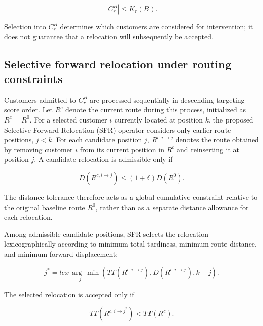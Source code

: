 \documentclass[11pt,a4paper]{article}
\begin{document}
\begin{equation}
\left| C_{r}^{B} \right| \leq K_{r}(B).
\label{eq:14}
\end{equation}

Selection into \(C_{r}^{B}\) determines which customers are considered
for intervention; it does not guarantee that a relocation will
subsequently be accepted.

\subsection{Selective forward relocation under routing constraints}\label{sec:sfr}

Customers admitted to \(C_{r}^{B}\) are processed sequentially in
descending targeting-score order. Let \(R^{c}\) denote the current route
during this process, initialized as \(R^{c} = R^{0}\). For a selected
customer \(i\) currently located at position \(k\), the proposed
Selective Forward Relocation (SFR) operator considers only earlier route
positions, \(j < k\). For each candidate position \(j\),
\(R^{c,i \rightarrow j}\) denotes the route obtained by removing
customer \(i\) from its current position in \(R^{c}\) and reinserting it
at position \(j\). A candidate relocation is admissible only if

\begin{equation}
D\left( R^{c,i \rightarrow j} \right) \leq (1 + \delta)D\left( R^{0} \right).
\label{eq:15}
\end{equation}

The distance tolerance therefore acts as a global cumulative constraint
relative to the original baseline route \(R^{0}\), rather than as a
separate distance allowance for each relocation.

Among admissible candidate positions, SFR selects the relocation
lexicographically according to minimum total tardiness, minimum route
distance, and minimum forward displacement:

\begin{equation}
j^{*} = \underset{j}{lex\,\arg\,\min}(TT\left( R^{c,i \rightarrow j} \right),D\left( R^{c,i \rightarrow j} \right),k - j).
\label{eq:16}
\end{equation}

The selected relocation is accepted only if

\begin{equation}
TT\left( R^{c,i \rightarrow j^{*}} \right) < TT\left( R^{c} \right).
\label{eq:17}
\end{equation}
\end{document}
